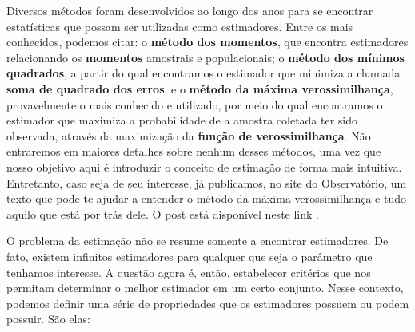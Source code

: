 \documentclass[
  letterpaper,
  DIV=11,
  numbers=noendperiod]{scrreprt}
\begin{document}
Diversos métodos foram desenvolvidos ao longo dos anos para se encontrar
estatísticas que possam ser utilizadas como estimadores. Entre os mais
conhecidos, podemos citar: o \textbf{método dos momentos}, que encontra
estimadores relacionando os \textbf{momentos} amostrais e populacionais;
o \textbf{método dos mínimos quadrados}, a partir do qual encontramos o
estimador que minimiza a chamada \textbf{soma de quadrado dos erros}; e
o \textbf{método da máxima verossimilhança}, provavelmente o mais
conhecido e utilizado, por meio do qual encontramos o estimador que
maximiza a probabilidade de a amostra coletada ter sido observada,
através da maximização da \textbf{função de verossimilhança}. Não
entraremos em maiores detalhes sobre nenhum desses métodos, uma vez que
nosso objetivo aqui é introduzir o conceito de estimação de forma mais
intuitiva. Entretanto, caso seja de seu interesse, já publicamos, no
site do Observatório, um texto que pode te ajudar a entender o método da
máxima verossimilhança e tudo aquilo que está por trás dele. O post está
disponível neste link .

O problema da estimação não se resume somente a encontrar estimadores.
De fato, existem infinitos estimadores para qualquer que seja o
parâmetro que tenhamos interesse. A questão agora é, então, estabelecer
critérios que nos permitam determinar o melhor estimador em um certo
conjunto. Nesse contexto, podemos definir uma série de propriedades que
os estimadores possuem ou podem possuir. São elas:
\end{document}
